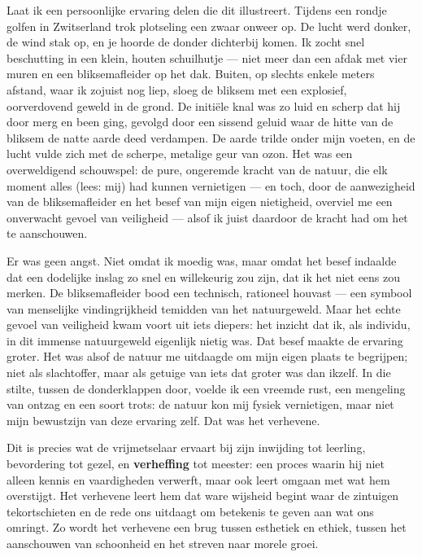 \documentclass{article}
\begin{document}
Laat ik een persoonlijke ervaring delen die dit illustreert.
Tijdens een rondje golfen in Zwitserland trok plotseling een zwaar onweer op. De lucht werd donker, de wind stak op, en je hoorde de donder dichterbij komen. Ik zocht snel beschutting in een klein, houten schuilhutje — niet meer dan een afdak met vier muren en een bliksemafleider op het dak. Buiten, op slechts enkele meters afstand, waar ik zojuist nog liep, sloeg de bliksem met een explosief, oorverdovend geweld in de grond. De initiële knal was zo luid en scherp dat hij door merg en been ging, gevolgd door een sissend geluid waar de hitte van de bliksem de natte aarde deed verdampen. De aarde trilde onder mijn voeten, en de lucht vulde zich met de scherpe, metalige geur van ozon. Het was een overweldigend schouwspel: de pure, ongeremde kracht van de natuur, die elk moment alles (lees: mij) had kunnen vernietigen — en toch, door de aanwezigheid van de bliksemafleider en het besef van mijn eigen nietigheid, overviel me een onverwacht gevoel van veiligheid --- alsof ik juist daardoor de kracht had om het te aanschouwen.

Er was geen angst. Niet omdat ik moedig was, maar omdat het besef indaalde dat een dodelijke inslag zo snel en willekeurig zou zijn, dat ik het niet eens zou merken. De bliksemafleider bood een technisch, rationeel houvast — een symbool van menselijke vindingrijkheid temidden van het natuurgeweld. Maar het echte gevoel van veiligheid kwam voort uit iets diepers: het inzicht dat ik, als individu, in dit immense natuurgeweld eigenlijk nietig was. Dat besef maakte de ervaring groter. Het was alsof de natuur me uitdaagde om mijn eigen plaats te begrijpen; niet als slachtoffer, maar als getuige van iets dat groter was dan ikzelf. In die stilte, tussen de donderklappen door, voelde ik een vreemde rust, een mengeling van ontzag en een soort trots: de natuur kon mij fysiek vernietigen, maar niet mijn bewustzijn van deze ervaring zelf. Dat was het verhevene.

\bigskip
Dit is precies wat de vrijmetselaar ervaart bij zijn inwijding tot leerling, bevordering tot gezel, en \textbf{verheffing} tot meester: een proces waarin hij niet alleen kennis en vaardigheden verwerft, maar ook leert omgaan met wat hem overstijgt. Het verhevene leert hem dat ware wijsheid begint waar de zintuigen tekortschieten en de rede ons uitdaagt om betekenis te geven aan wat ons omringt. Zo wordt het verhevene een brug tussen esthetiek en ethiek, tussen het aanschouwen van schoonheid en het streven naar morele groei.
\end{document}
